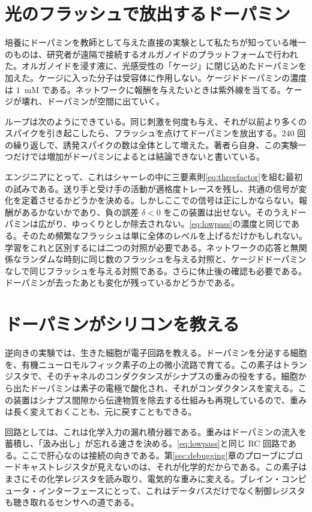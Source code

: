 \section{光のフラッシュで放出するドーパミン}
\label{sec:dishdopamine}

培養にドーパミンを教師として与えた直接の実験として私たちが知っている唯一のものは、研究者が遠隔で接続するオルガノイドのプラットフォームで行われた\cite{Jordan2024}。オルガノイドを浸す液に、光感受性の「ケージ」に閉じ込めたドーパミンを加えた。ケージに入った分子は受容体に作用しない。ケージドドーパミンの濃度は $1$~mM である。ネットワークに報酬を与えたいときは紫外線を当てる。ケージが壊れ、ドーパミンが空間に出ていく。

ループは次のようにできている。同じ刺激を何度も与え、それが以前より多くのスパイクを引き起こしたら、フラッシュを点けてドーパミンを放出する。$240$ 回の繰り返しで、誘発スパイクの数は全体として増えた。著者ら自身、この実験一つだけでは増加がドーパミンによるとは結論できないと書いている\cite{Jordan2024}。

エンジニアにとって、これはシャーレの中に三要素則\eqref{eq:threefactor}を組む最初の試みである。送り手と受け手の活動が適格度トレースを残し、共通の信号が変化を定着させるかどうかを決める。しかしここでの信号は正にしかならない。報酬があるかないかであり、負の誤差 $\delta<0$ をこの装置は出せない。そのうえドーパミンは広がり、ゆっくりとしか除去されない。\eqref{eq:lowpass}の濃度と同じである。そのため頻繁なフラッシュは単に全体のレベルを上げるだけかもしれない。学習をこれと区別するには二つの対照が必要である。ネットワークの応答と無関係なランダムな時刻に同じ数のフラッシュを与える対照と、ケージドドーパミンなしで同じフラッシュを与える対照である。さらに休止後の確認も必要である。ドーパミンが去ったあとも変化が残っているかどうかである。

\section{ドーパミンがシリコンを教える}
\label{sec:biohybrid}

逆向きの実験では、生きた細胞が電子回路を教える\cite{Keene2020}。ドーパミンを分泌する細胞を、有機ニューロモルフィック素子の上の微小流路で育てる。この素子はトランジスタで、そのチャネルのコンダクタンスがシナプスの重みの役をする。細胞から出たドーパミンは素子の電極で酸化され、それがコンダクタンスを変える。この装置はシナプス間隙から伝達物質を除去する仕組みも再現しているので、重みは長く変えておくことも、元に戻すこともできる。

回路としては、これは化学入力の漏れ積分器である。重みはドーパミンの流入を蓄積し、「汲み出し」が忘れる速さを決める。\eqref{eq:lowpass}と同じ RC 回路である。ここで肝心なのは接続の向きである。第\ref{sec:debugging}章のプローブにブロードキャストレジスタが見えないのは、それが化学的だからである。この素子はまさにその化学レジスタを読み取り、電気的な重みに変える。ブレイン・コンピュータ・インターフェースにとって、これはデータバスだけでなく制御レジスタも聴き取れるセンサへの道である。

